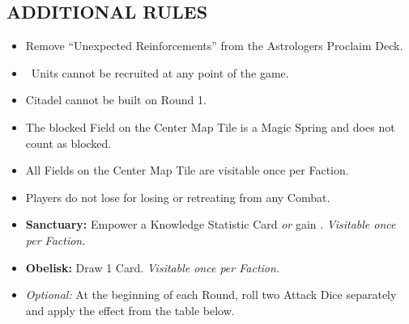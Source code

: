 \begin{multicols*}{2}
\subsection*{\MakeUppercase{Additional Rules}}
\begin{itemize}
  \item Remove ``Unexpected Reinforcements'' from the Astrologers Proclaim Deck.
  \item \azure\ Units cannot be recruited at any point of the game.
  \item Citadel cannot be built on Round 1.
  \item The blocked Field on the Center Map Tile is a Magic Spring and does not count as blocked.
  \item All Fields on the Center Map Tile are visitable once per Faction.
  \item Players do not lose  for losing or retreating from any Combat.
  \item \textbf{Sanctuary:} Empower a Knowledge Statistic Card \textit{or} gain . \textit{Visitable once per Faction.}
  \item \textbf{Obelisk:} Draw 1 Card. \textit{Visitable once per Faction.}
  \item \textit{Optional:} At the beginning of each Round, roll two Attack Dice separately and apply the effect from the table below.
\end{itemize}

\end{multicols*}
